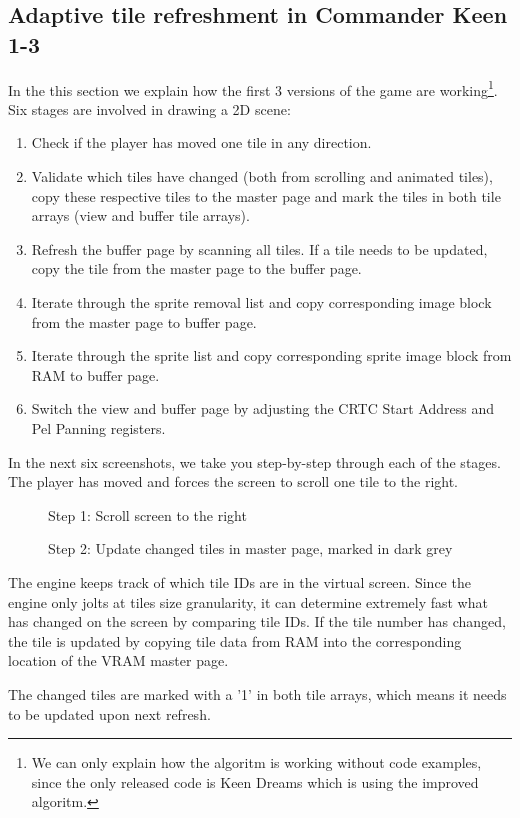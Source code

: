 \documentclass[book.tex]{subfiles}
\begin{document}
\subsection{Adaptive tile refreshment in Commander Keen 1-3}
In the this section we explain how the first 3 versions of the game are working\footnote{We can only explain how the algoritm is working without code examples, since the only released code is Keen Dreams which is using the improved algoritm.}. Six stages are involved in drawing a 2D scene:
\begin{enumerate}
\item Check if the player has moved one tile in any direction.
\item Validate which tiles have changed (both from scrolling and animated tiles), copy these respective tiles to the master page and mark the tiles in both tile arrays (view and buffer tile arrays).
\item Refresh the buffer page by scanning all tiles. If a tile needs to be updated, copy the tile from the master page to the buffer page.
\item Iterate through the sprite removal list and copy corresponding image block from the master page to buffer page. 
\item Iterate through the sprite list and copy corresponding sprite image block from RAM to buffer page.
\item Switch the view and buffer page by adjusting the CRTC Start Address and Pel Panning registers.
\end{enumerate}



In the next six screenshots, we take you step-by-step through each of the stages. The player has moved and forces the screen to scroll one tile to the right. \\

\begin{figure}[H]
\centering
 \caption{Step 1: Scroll screen to the right}
 \label{fig:kc1_3_start}
\end{figure}

\begin{figure}[H]
\centering
 \caption{Step 2: Update changed tiles in master page, marked in dark grey}
 \label{fig:kc1_3_update_masterscreen}
\end{figure}

The engine keeps track of which tile IDs are in the virtual screen. Since the engine only jolts at tiles size granularity, it can determine extremely fast what has changed on the screen by comparing tile IDs. If the tile number has changed, the tile is updated by copying tile data from RAM into the corresponding location of the VRAM master page.\\
\par
The changed tiles are marked with a '1' in both tile arrays, which means it needs to be updated upon next refresh.
\end{document}

